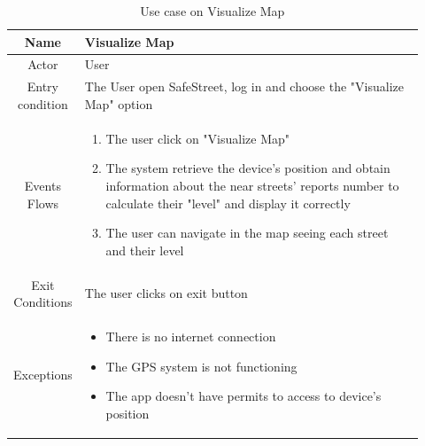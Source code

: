 \documentclass[12pt,a4paper]{report}
\begin{document}
				\begin{table}[H]
					\centering
					\begin{tabular}{|c|p{0.92\linewidth}|}
						\hline
						Name & {Visualize Map} \\
						\hline
						Actor & {User} \\
						\hline
						Entry condition & {The User open SafeStreet, log in and choose the "Visualize Map" option} \\
						\hline
						Events Flows &{ 
								\vskip 4pt
								\begin{enumerate}
									\item The user click on "Visualize Map"
									\item The system retrieve the device's position and obtain information about
										the near streets' reports number to calculate their "level" and display
										it correctly
									\item The user can navigate in the map seeing each street and their level
								\end{enumerate}
								\vskip 4pt}\\
						\hline
						Exit Conditions & {The user clicks on exit button} \\
						\hline
						Exceptions & {
								\vskip 4pt
								\begin{itemize}
									\item There is no internet connection
									\item The GPS system is not functioning
									\item The app doesn't have permits to access to device's position
								\end{itemize}
								\vskip 4pt
						} \\
						\hline
					\end{tabular}
					\caption{Use case on Visualize Map}
					\label{tab: }
				\end{table}
				
\end{document}
